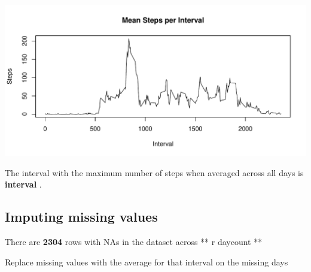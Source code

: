 \documentclass[]{article}
\newenvironment{Shaded}{\begin{snugshade}}{\end{snugshade}}
\newcommand{\KeywordTok}[1]{\textcolor[rgb]{0.13,0.29,0.53}{\textbf{{#1}}}}
\newcommand{\StringTok}[1]{\textcolor[rgb]{0.31,0.60,0.02}{{#1}}}
\newcommand{\CommentTok}[1]{\textcolor[rgb]{0.56,0.35,0.01}{\textit{{#1}}}}
\newcommand{\NormalTok}[1]{{#1}}
\begin{document}
\includegraphics{PA1_template_files/figure-latex/unnamed-chunk-5-1.pdf}

\begin{Shaded}
\end{Shaded}

The interval with the maximum number of steps when averaged across all
days is \textbf{interval }.

\subsection{Imputing missing values}\label{imputing-missing-values-1}

\begin{Shaded}
\end{Shaded}

There are \textbf{2304} rows with NAs in the dataset across ** r
daycount **

Replace missing values with the average for that interval on the missing
days
\end{document}
